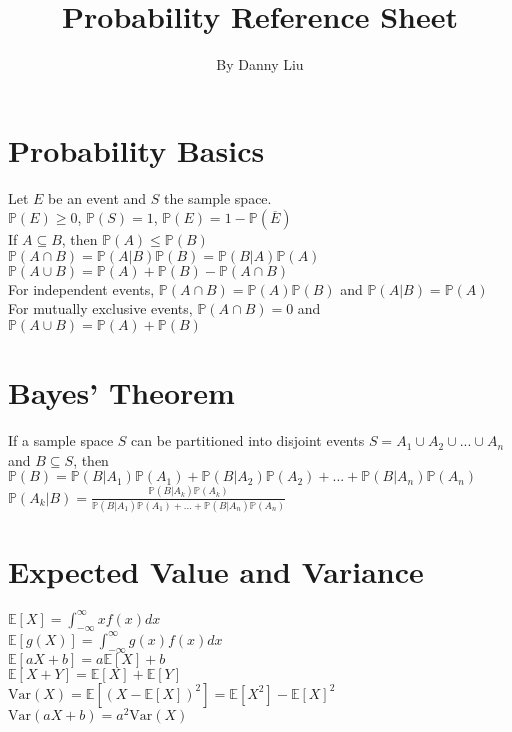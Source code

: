 \documentclass{article}
\title{Probability Reference Sheet}
\author{By Danny Liu}
\date{}
\renewcommand{\P}{\mathbb{P}}
\newcommand{\E}{\mathbb{E}}
\newcommand{\V}{\mbox{Var}}
\begin{document}
\maketitle

\section{Probability Basics}
Let $E$ be an event and $S$ the sample space. \\
$\P(E) \geq 0$, $\P(S) = 1$, $\P(E) = 1-\P(\overline{E})$ \\
If $A \subseteq B$, then $\P(A) \leq \P(B)$ \\
$\P(A\cap B) = \P(A|B)\P(B) = \P(B|A)\P(A)$ \\
$\P(A\cup B) = \P(A) + \P(B) - \P(A\cap B)$ \\
For independent events, $\P(A\cap B) = \P(A)\P(B)$ and $\P(A|B) = \P(A)$ \\
For mutually exclusive events, $\P(A\cap B) = 0$ and $\P(A\cup B) = \P(A) + \P(B)$ 

\section{Bayes' Theorem}
If a sample space $S$ can be partitioned into disjoint events $S = A_1\cup A_2\cup ... \cup A_n$ and $B \subseteq S$, then 
$\P(B) = \P(B|A_1)\P(A_1) + \P(B|A_2)\P(A_2) + ... + \P(B|A_n)\P(A_n)$ \\
$\P(A_k|B) = \frac{\P(B|A_k)\P(A_k)}{\P(B|A_1)\P(A_1) + ... + \P(B|A_n)\P(A_n)}$

\section{Expected Value and Variance}
$\E[X] = \int_{-\infty}^{\infty}x f(x)dx$ \\
$\E[g(X)] = \int_{-\infty}^{\infty}g(x) f(x)dx$  \\
$\E[aX + b] = a\E[X] + b$ \\
$\E[X + Y] = \E[X] + \E[Y]$ \\
$\V(X) = \E[(X-\E[X])^2] = \E[X^2] - \E[X]^2$ \\
$\V(aX + b) = a^2\V(X)$
\end{document}
